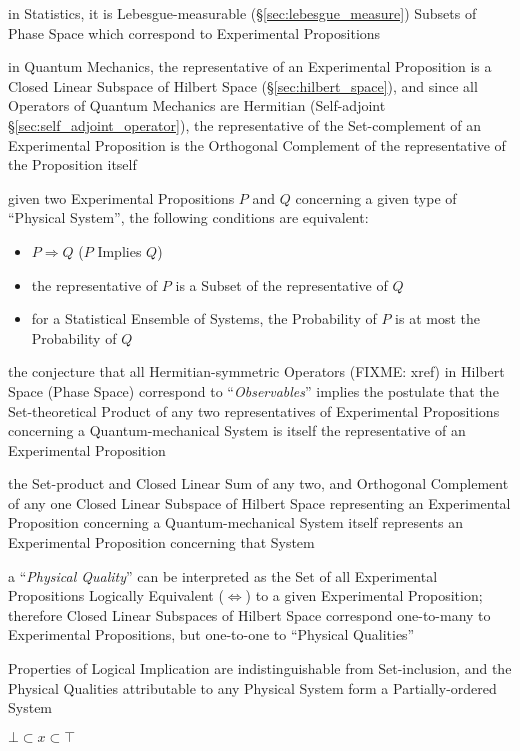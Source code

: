 in Statistics, it is Lebesgue-measurable (\S\ref{sec:lebesgue_measure}) Subsets
of Phase Space which correspond to Experimental Propositions

in Quantum Mechanics, the representative of an Experimental Proposition is a
Closed Linear Subspace of Hilbert Space (\S\ref{sec:hilbert_space}), and since
all Operators of Quantum Mechanics are Hermitian (Self-adjoint
\S\ref{sec:self_adjoint_operator}), the representative of the Set-complement of
an Experimental Proposition is the Orthogonal Complement of the representative
of the Proposition itself

given two Experimental Propositions $P$ and $Q$ concerning a given type of
``Physical System'', the following conditions are equivalent:
\begin{itemize}
  \item $P \Rightarrow Q$ ($P$ Implies $Q$)
  \item the representative of $P$ is a Subset of the representative of $Q$
  \item for a Statistical Ensemble of Systems, the Probability of $P$ is at most
    the Probability of $Q$
\end{itemize}

the conjecture that all Hermitian-symmetric Operators (FIXME: xref) in Hilbert
Space (Phase Space) correspond to ``\emph{Observables}'' implies the postulate
that the Set-theoretical Product of any two representatives of Experimental
Propositions concerning a Quantum-mechanical System is itself the representative
of an Experimental Proposition

the Set-product and Closed Linear Sum of any two, and Orthogonal Complement of
any one Closed Linear Subspace of Hilbert Space representing an Experimental
Proposition concerning a Quantum-mechanical System itself represents an
Experimental Proposition concerning that System

a ``\emph{Physical Quality}'' can be interpreted as the Set of all Experimental
Propositions Logically Equivalent ($\Leftrightarrow$) to a given Experimental
Proposition; therefore Closed Linear Subspaces of Hilbert Space correspond
one-to-many to Experimental Propositions, but one-to-one to ``Physical
Qualities''

Properties of Logical Implication are indistinguishable from Set-inclusion, and
the Physical Qualities attributable to any Physical System form a
Partially-ordered System

$\bot \subset x \subset \top$

